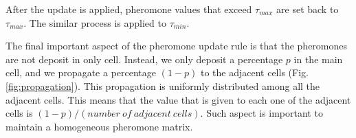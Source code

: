 			After the update is applied, pheromone values that exceed $\tau_{max}$ are set back to $\tau_{max}$. The similar process is applied to $\tau_{min}$.

			The final important aspect of the pheromone update rule is that the pheromones are not deposit in only cell. Instead, we only deposit a percentage $p$ in the main cell, and we propagate a percentage $(1-p)$ to the adjacent cells (Fig. \ref{fig:propagation}). This propagation is uniformly distributed among all the adjacent cells. This means that the value that is given to each one of the adjacent cells is $(1-p) / (number\ of\ adjacent\ cells)$. Such aspect is important to maintain a homogeneous pheromone matrix.
			
			
			
			
			
			